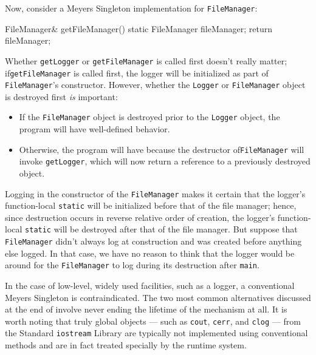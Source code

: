 \noindent Now, consider a Meyers Singleton implementation for
\lstinline!FileManager!:

\begin{emcppslisting}[emcppsbatch=e15]
FileManager& getFileManager()
{
    static FileManager fileManager;
    return fileManager;
}
\end{emcppslisting}

\noindent Whether \lstinline!getLogger! or \lstinline!getFileManager! is called first
doesn't really matter; if\linebreak[4]%
 \lstinline!getFileManager! is called first, the
logger will be initialized as part of \lstinline!FileManager!'s
constructor. However, whether the \lstinline!Logger! or
\lstinline!FileManager! object is destroyed first \emph{is} important:

\begin{itemize}
\item{If the \lstinline!FileManager! object is destroyed prior to the \lstinline!Logger! object, the program will have well-defined behavior.}
\item{Otherwise, the program will have  because the destructor of\linebreak[4]%
 \lstinline!FileManager! will invoke \lstinline!getLogger!, which will now return a reference to a previously destroyed object.}
\end{itemize}

Logging in the constructor of the \lstinline!FileManager!
makes it certain that the logger's function-local
\lstinline!static! will be initialized before that of the file manager;
hence, since destruction occurs in reverse relative order of creation,
the logger's function-local \lstinline!static! will be destroyed after\linebreak[4]
\newpage%
that
of the file manager. But suppose that \lstinline!FileManager! didn't always
log at construction and was created before anything else logged. In that
case, we have no reason to think that the logger would be around for the
\lstinline!FileManager! to log during its destruction after \lstinline!main!.

In the case of low-level, widely used facilities, such as a logger, a
conventional Meyers Singleton is contraindicated. The two most common
alternatives discussed at the end of  involve never ending the lifetime of
the mechanism at all. It is worth noting that truly global objects ---
such as \lstinline!cout!, \lstinline!cerr!, and \lstinline!clog! --- from the
Standard \lstinline!iostream! Library are typically not implemented using
conventional methods and are in fact treated specially by the runtime system.

